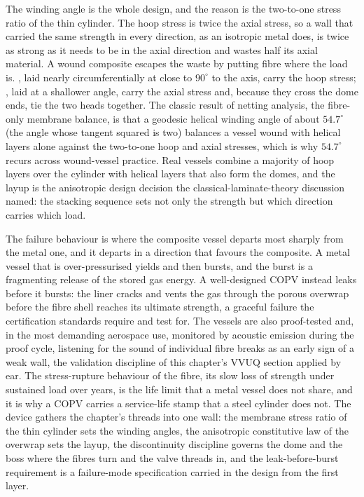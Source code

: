 The winding angle is the whole design, and the reason is the two-to-one
stress ratio of the thin cylinder. The hoop stress is twice the axial stress,
so a wall that carried the same strength in every direction, as an isotropic
metal does, is twice as strong as it needs to be in the axial direction and
wastes half its axial material. A wound composite escapes the waste by putting
fibre where the load is. , laid nearly circumferentially
at close to $90^\circ$ to the axis, carry the hoop stress; , laid at a shallower angle, carry the axial stress and, because they
cross the dome ends, tie the two heads together. The classic result of
netting analysis, the fibre-only membrane balance, is that a geodesic helical
winding angle of about $54.7^\circ$ (the angle whose tangent squared is two)
balances a vessel wound with helical layers alone against the two-to-one hoop
and axial stresses, which is why $54.7^\circ$ recurs across wound-vessel
practice. Real vessels combine a majority of hoop layers over the cylinder
with helical layers that also form the domes, and the layup is the anisotropic
design decision the classical-laminate-theory discussion named: the stacking
sequence sets not only the strength but which direction carries which load.

The failure behaviour is where the composite vessel departs most sharply from
the metal one, and it departs in a direction that favours the composite. A
metal vessel that is over-pressurised yields and then bursts, and the burst is
a fragmenting release of the stored gas energy. A well-designed COPV instead
leaks before it bursts: the liner cracks and vents the gas through the porous
overwrap before the fibre shell reaches its ultimate strength, a graceful
failure the certification standards require and test for. The vessels are also
proof-tested and, in the most demanding aerospace use, monitored by acoustic
emission during the proof cycle, listening for the sound of individual fibre
breaks as an early sign of a weak wall, the validation discipline of this
chapter's VVUQ section applied by ear. The stress-rupture behaviour of the
fibre, its slow loss of strength under sustained load over years, is the life
limit that a metal vessel does not share, and it is why a COPV carries a
service-life stamp that a steel cylinder does not. The device gathers the
chapter's threads into one wall: the membrane stress ratio of the thin
cylinder sets the winding angles, the anisotropic constitutive law of the
overwrap sets the layup, the discontinuity discipline governs the dome and the
boss where the fibres turn and the valve threads in, and the
leak-before-burst requirement is a failure-mode specification carried in the
design from the first layer.

